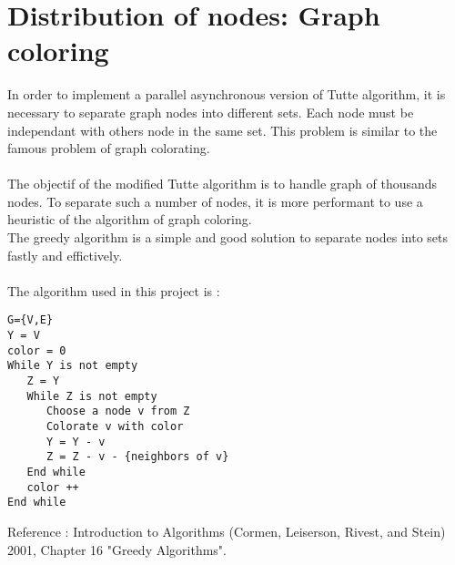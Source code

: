 \section*{Distribution of nodes: Graph coloring}
In order to implement a parallel asynchronous version of Tutte algorithm, it is necessary to separate graph nodes into different sets. Each node must be independant with others node in the same set. This problem is similar to the famous problem of graph colorating.
\paragraph*{}
The objectif of the modified Tutte algorithm is to handle graph of thousands nodes. To separate such a number of nodes, it is more performant to use a heuristic of the algorithm of graph coloring.\\
The greedy algorithm is a simple and good solution to separate nodes into sets fastly and effictively.
\paragraph*{}
The algorithm used in this project is :
\begin{verbatim}
G={V,E}
Y = V
color = 0
While Y is not empty
   Z = Y
   While Z is not empty
      Choose a node v from Z
      Colorate v with color
      Y = Y - v
      Z = Z - v - {neighbors of v}
   End while
   color ++
End while
\end{verbatim}

Reference : Introduction to Algorithms (Cormen, Leiserson, Rivest, and Stein) 2001, Chapter 16 "Greedy Algorithms".